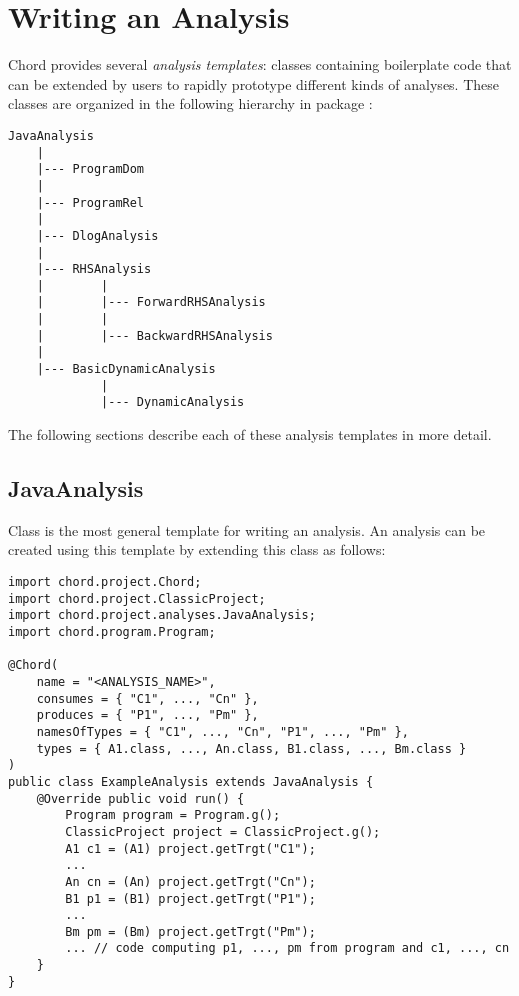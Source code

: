 \chapter{Writing an Analysis}
\label{chap:writing-analysis}

Chord provides several {\it analysis templates}: classes containing boilerplate
code that can be extended by users to rapidly prototype different kinds of
analyses.  These classes are organized in the following hierarchy in
package :

\begin{verbatim}
JavaAnalysis
    |
    |--- ProgramDom
    |
    |--- ProgramRel
    |
    |--- DlogAnalysis
    |
    |--- RHSAnalysis
    |        |
    |        |--- ForwardRHSAnalysis
    |        |
    |        |--- BackwardRHSAnalysis
    |
    |--- BasicDynamicAnalysis
             |
             |--- DynamicAnalysis
\end{verbatim}

The following sections describe each of these analysis templates in more detail.

\section{JavaAnalysis}
\label{sec:java-analysis}

Class  is the most general
template for writing an analysis.  An analysis can be created using this template by extending this class as follows:

\begin{framed}
\begin{verbatim}
import chord.project.Chord;
import chord.project.ClassicProject;
import chord.project.analyses.JavaAnalysis;
import chord.program.Program;

@Chord(
    name = "<ANALYSIS_NAME>",
    consumes = { "C1", ..., "Cn" },
    produces = { "P1", ..., "Pm" },
    namesOfTypes = { "C1", ..., "Cn", "P1", ..., "Pm" },
    types = { A1.class, ..., An.class, B1.class, ..., Bm.class }
)
public class ExampleAnalysis extends JavaAnalysis {
    @Override public void run() {
        Program program = Program.g();
        ClassicProject project = ClassicProject.g();
        A1 c1 = (A1) project.getTrgt("C1");
        ...
        An cn = (An) project.getTrgt("Cn");
        B1 p1 = (B1) project.getTrgt("P1");
        ...
        Bm pm = (Bm) project.getTrgt("Pm");
        ... // code computing p1, ..., pm from program and c1, ..., cn
    }
}
\end{verbatim}
\end{framed}

